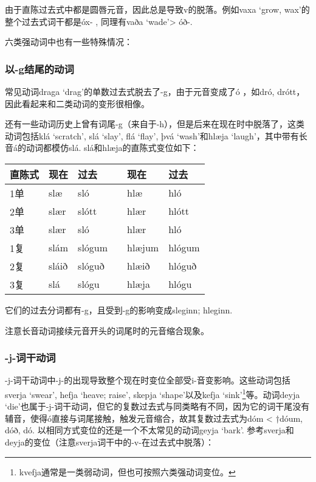 由于直陈过去式中都是圆唇元音，因此总是导致v的脱落。例如vaxa `grow, wax‌'的整个过去式词干都是óx- , 同理有vaða `wade‌'> óð-.

六类强动词中也有一些特殊情况：


\subsubsection{以-g结尾的动词}

常见动词draga `drag‌'的单数过去式脱去了-g，由于元音变成了ó ，如dró,
drótt，因此看起来和二类动词的变形很相像。

还有一些动词历史上曾有词尾-g（来自于-h），但是后来在现在时中脱落了，这类动词包括klá `scratch', slá `slay', flá `flay', þvá `wash'和hlæja
`laugh‌'，其中带有长音á的动词都模仿slá. slá和hlæja的直陈式变位如下：

\begin{longtable}{llllll}
    \toprule
    直陈式 & 现在  & 过去   &  & 现在   & 过去   \\
    \midrule
    \endhead
    \bottomrule
    \endfoot
    1单    & slæ   & sló    &  & hlæ    & hló    \\
    2单    & slær  & slótt  &  & hlær   & hlótt  \\
    3单    & slær  & sló    &  & hlær   & hló    \\
    1复    & slám  & slógum &  & hlæjum & hlógum \\
    2复    & sláið & slóguð &  & hlæið  & hlóguð \\
    3复    & slá   & slógu  &  & hlæja  & hlógu  \\
\end{longtable}

它们的过去分词都有-g，且受到-g的影响变成sleginn; hleginn.

注意长音动词接续元音开头的词尾时的元音缩合现象。


\subsubsection{-j-词干动词}

-j-词干动词中-j-的出现导致整个现在时变位全部受i-音变影响。这些动词包括sverja `swear', hefja `heave; raise', skepja `shape'以及kefja
`sink'\footnote{kvefja通常是一类弱动词，但也可按照六类强动词变位。}等。动词deyja `die'也属于-j-词干动词，但它的复数过去式与同类略有不同，因为它的词干尾没有辅音，使得ó直接与词尾接触，触发元音缩合，故其复数过去式为dóm < †dóum, dóð, dó. 以相同方式变位的还是一个不太常见的动词geyja `bark'. 参考sverja和deyja的变位（注意sverja词干中的-v-在过去式中脱落）：

